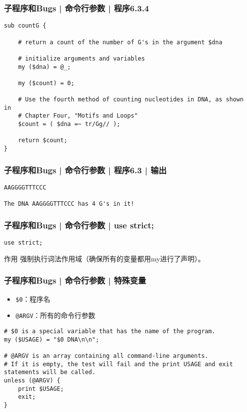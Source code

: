 \begin{frame}[fragile]
  \frametitle{子程序和Bugs | 命令行参数 | 程序6.3.4}
\begin{lstlisting}[firstnumber=37,basicstyle=\small\tt]
sub countG {

    # return a count of the number of G's in the argument $dna

    # initialize arguments and variables
    my ($dna) = @_;

    my ($count) = 0;

    # Use the fourth method of counting nucleotides in DNA, as shown in
    # Chapter Four, "Motifs and Loops"
    $count = ( $dna =~ tr/Gg// );

    return $count;
}
\end{lstlisting}
\end{frame}

\begin{frame}[fragile]
  \frametitle{子程序和Bugs | 命令行参数 | 程序6.3 | 输出}
\begin{lstlisting}
AAGGGGTTTCCC

The DNA AAGGGGTTTCCC has 4 G's in it!
\end{lstlisting}
\end{frame}

\begin{frame}[fragile]
  \frametitle{子程序和Bugs | 命令行参数 | \alert{use strict;}}
\begin{lstlisting}
use strict;
\end{lstlisting}
\begin{block}{作用}
强制执行词法作用域（确保所有的变量都用my进行了声明）。
\end{block}
\end{frame}

\begin{frame}[fragile]
  \frametitle{子程序和Bugs | 命令行参数 | \alert{特殊变量}}
  \begin{itemize}
    \item \verb|$0|：程序名
    \item \verb|@ARGV|：所有的命令行参数
  \end{itemize}
\begin{lstlisting}
# $0 is a special variable that has the name of the program.
my ($USAGE) = "$0 DNA\n\n";

# @ARGV is an array containing all command-line arguments.
# If it is empty, the test will fail and the print USAGE and exit statements will be called.
unless (@ARGV) {
    print $USAGE;
    exit;
}
\end{lstlisting}
\end{frame}

